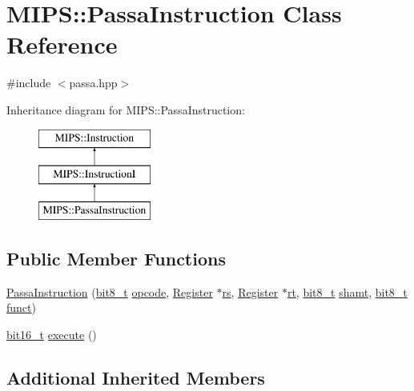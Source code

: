 \hypertarget{classMIPS_1_1PassaInstruction}{}\section{M\+I\+PS\+:\+:Passa\+Instruction Class Reference}
\label{classMIPS_1_1PassaInstruction}


{\ttfamily \#include $<$passa.\+hpp$>$}

Inheritance diagram for M\+I\+PS\+:\+:Passa\+Instruction\+:\begin{figure}[H]
\begin{center}
\leavevmode
\includegraphics[height=3.000000cm]{classMIPS_1_1PassaInstruction}
\end{center}
\end{figure}
\subsection*{Public Member Functions}
\begin{DoxyCompactItemize}
\item 
\hyperlink{classMIPS_1_1PassaInstruction_acc56ffbb33152fef680a714c2ba4a154}{Passa\+Instruction} (\hyperlink{core_8hpp_a6074bae122ae7b527864eec42c728c3c}{bit8\+\_\+t} \hyperlink{classMIPS_1_1Instruction_a45cc6808b5dde8a5d41067d148b55476}{opcode}, \hyperlink{classMIPS_1_1Register}{Register} $\ast$\hyperlink{classMIPS_1_1InstructionI_a2be191d5b3dce505e2e626ec02eb4d62}{rs}, \hyperlink{classMIPS_1_1Register}{Register} $\ast$\hyperlink{classMIPS_1_1InstructionI_add1db07a5c954f35271de8c8a5737487}{rt}, \hyperlink{core_8hpp_a6074bae122ae7b527864eec42c728c3c}{bit8\+\_\+t} \hyperlink{classMIPS_1_1InstructionI_aa9b6da37c374c2ec8d96448d341e5e7d}{shamt}, \hyperlink{core_8hpp_a6074bae122ae7b527864eec42c728c3c}{bit8\+\_\+t} \hyperlink{classMIPS_1_1InstructionI_a5c6efcbbd233a7447c1fe24ea0a1e558}{funct})
\item 
\hyperlink{core_8hpp_adc265a970bc35995b5879784bbb3f1b7}{bit16\+\_\+t} \hyperlink{classMIPS_1_1PassaInstruction_ae23b43bfb84d2ef69fa25e50fb5b6072}{execute} ()
\end{DoxyCompactItemize}
\subsection*{Additional Inherited Members}



